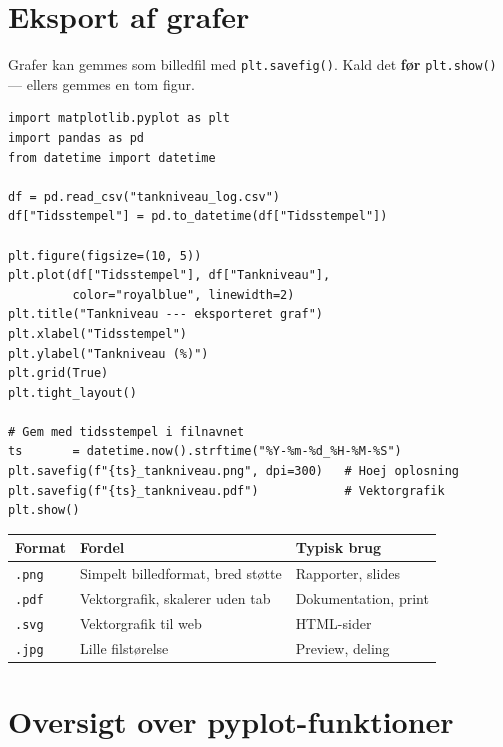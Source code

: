 \documentclass[12pt, a4paper]{article}
\begin{document}
\section{Eksport af grafer}

Grafer kan gemmes som billedfil med \texttt{plt.savefig()}. Kald det
\textbf{før} \texttt{plt.show()} --- ellers gemmes en tom figur.

\begin{tcolorbox}[pythonbox, title={\faPython\quad Kode 6 --- Gem graf i PNG og PDF}]
\begin{verbatim}
import matplotlib.pyplot as plt
import pandas as pd
from datetime import datetime

df = pd.read_csv("tankniveau_log.csv")
df["Tidsstempel"] = pd.to_datetime(df["Tidsstempel"])

plt.figure(figsize=(10, 5))
plt.plot(df["Tidsstempel"], df["Tankniveau"],
         color="royalblue", linewidth=2)
plt.title("Tankniveau --- eksporteret graf")
plt.xlabel("Tidsstempel")
plt.ylabel("Tankniveau (%)")
plt.grid(True)
plt.tight_layout()

# Gem med tidsstempel i filnavnet
ts       = datetime.now().strftime("%Y-%m-%d_%H-%M-%S")
plt.savefig(f"{ts}_tankniveau.png", dpi=300)   # Hoej oplosning
plt.savefig(f"{ts}_tankniveau.pdf")            # Vektorgrafik
plt.show()
\end{verbatim}
\end{tcolorbox}

\begin{center}
\begin{tabular}{lll}
\toprule
\textbf{Format} & \textbf{Fordel} & \textbf{Typisk brug} \\
\midrule
\texttt{.png} & Simpelt billedformat, bred støtte & Rapporter, slides \\
\texttt{.pdf} & Vektorgrafik, skalerer uden tab   & Dokumentation, print \\
\texttt{.svg} & Vektorgrafik til web               & HTML-sider \\
\texttt{.jpg} & Lille filstørelse                  & Preview, deling \\
\bottomrule
\end{tabular}
\end{center}
\clearpage
\section{Oversigt over pyplot-funktioner}
\end{document}
